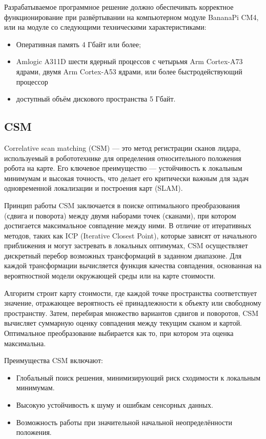 Разрабатываемое программное решение должно обеспечивать корректное
функционирование при развёртывании на компьютерном модуле BananaPi CM4, или
на модуле со следующими техническими характеристиками:

\begin{itemize}
	\item Оперативная память 4 Гбайт или более;
	\item Amlogic A311D шести ядерный процессов с четырьмя Arm Cortex-A73
		ядрами, двумя Arm Cortex-A53 ядрами, или более быстродействующий
		процессор
	\item доступный объём дискового пространства 5 Гбайт. %
\end{itemize}

\subsection{CSM}
Correlative scan matching (CSM) — это метод регистрации сканов лидара, используемый в робототехнике для определения относительного положения робота на карте. Его ключевое преимущество — устойчивость к локальным минимумам и высокая точность, что делает его критически важным для задач одновременной локализации и построения карт (SLAM).

Принцип работы CSM заключается в поиске оптимального преобразования (сдвига и поворота) между двумя наборами точек (сканами), при котором достигается максимальное совпадение между ними. В отличие от итеративных методов, таких как ICP (Iterative Closest Point), которые зависят от начального приближения и могут застревать в локальных оптимумах, CSM осуществляет дискретный перебор возможных трансформаций в заданном диапазоне. Для каждой трансформации вычисляется функция качества совпадения, основанная на вероятностной модели окружающей среды или на карте стоимости.

Алгоритм строит карту стоимости, где каждой точке пространства соответствует значение, отражающее вероятность её принадлежности к объекту или свободному пространству. Затем, перебирая множество вариантов сдвигов и поворотов, CSM вычисляет суммарную оценку совпадения между текущим сканом и картой. Оптимальное преобразование выбирается как то, при котором эта оценка максимальна.

Преимущества CSM включают:
\begin{itemize}
	\item Глобальный поиск решения, минимизирующий риск сходимости к локальным минимумам.
	\item Высокую устойчивость к шуму и ошибкам сенсорных данных.
	\item Возможность работы при значительной начальной неопределённости положения.
\end{itemize}

